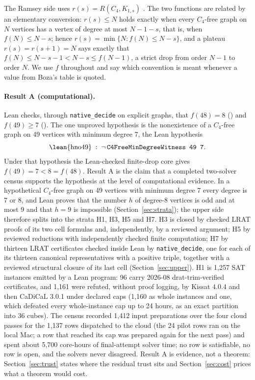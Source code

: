 \documentclass{anvil-paper}
\newcommand{\hnoFortyNine}{\lean{hno49}}
\theoremstyle{definition}
\begin{document}
The Ramsey side uses $r(s)=R(C_4,K_{1,s})$ \citep{boza2024ramsey,zhang2017polarity}. The two functions are related by an elementary conversion: $r(s)\le N$ holds exactly when every $C_4$-free graph on $N$ vertices has a vertex of degree at most $N-1-s$, that is, when $f(N)\le N-s$; hence $r(s)=\min\{N: f(N)\le N-s\}$, and a plateau $r(s)=r(s+1)=N$ says exactly that $f(N)\le N-s-1<N-s\le f(N-1)$, a strict drop from order $N-1$ to order $N$. We use $f$ throughout and say which convention is meant whenever a value from Boza's table is quoted.

\paragraph{Result A (computational).} Lean checks, through \texttt{native\_decide} on explicit graphs, that $f(48)=8$ () and $f(49)\ge 7$ (). The one unproved hypothesis is the nonexistence of a $C_4$-free graph on 49 vertices with minimum degree 7, the Lean hypothesis
\[
\text{\hnoFortyNine} \;:\; \neg\,\text{\texttt{C4FreeMinDegreeWitness 49 7}} .
\]
Under that hypothesis the Lean-checked finite-drop core gives $f(49)=7<8=f(48)$. Result A is the claim that a completed two-solver census supports the hypothesis at the level of computational evidence. In a hypothetical $C_4$-free graph on 49 vertices with minimum degree 7 every degree is 7 or 8, and Lean proves that the number $h$ of degree-8 vertices is odd and at most 9 and that $h=9$ is impossible (Section~\ref{sec:strata}); the upper side therefore splits into the strata H1, H3, H5 and H7. H3 is closed by checked LRAT proofs of its two cell formulas and, independently, by a reviewed argument; H5 by reviewed reductions with independently checked finite computation; H7 by thirteen LRAT certificates checked inside Lean by \texttt{native\_decide}, one for each of its thirteen canonical representatives with a positive triple, together with a reviewed structural closure of its last cell (Section~\ref{sec:upper}). H1 is 1,257 SAT instances emitted by a Lean program: 96 carry 2026-08 drat-trim-verified certificates, and 1,161 were refuted, without proof logging, by Kissat 4.0.4 and then CaDiCaL 3.0.1 under declared caps (1,160 as whole instances and one, which defeated every whole-instance cap up to 24 hours, as an exact partition into 36 cubes). The census recorded 1,412 input preparations over the four cloud passes for the 1,137 rows dispatched to the cloud (the 24 pilot rows ran on the local Mac; a row that reached its cap was prepared again for the next pass) and spent about 5,700 core-hours of final-attempt solver time; no row is satisfiable, no row is open, and the solvers never disagreed. Result A is evidence, not a theorem: Section~\ref{sec:trust} states where the residual trust sits and Section~\ref{sec:cost} prices what a theorem would cost.
\end{document}
